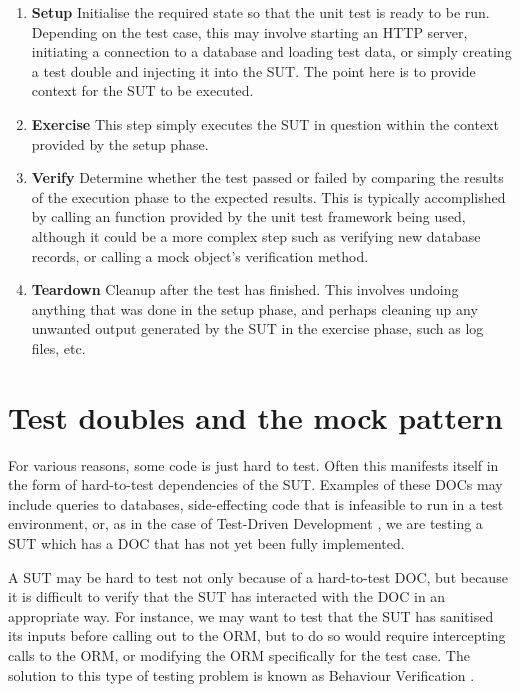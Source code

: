\begin{enumerate}

\item \textbf{Setup} Initialise the required state so that the unit
  test is ready to be run. Depending on the test case, this may
  involve starting an HTTP server, initiating a connection to a
  database and loading test data, or simply creating a test double and
  injecting it into the SUT. The point here is to provide context for
  the SUT to be executed.

\item \textbf{Exercise} This step simply executes the SUT in question
  within the context provided by the setup phase.

\item \textbf{Verify} Determine whether the test passed or failed by
  comparing the results of the execution phase to the expected
  results. This is typically accomplished by calling an 
  function provided by the unit test framework being used, although it
  could be a more complex step such as verifying new database
  records, or calling a mock object's verification
  method.%

\item \textbf{Teardown} Cleanup after the test has finished. This
  involves undoing anything that was done in the setup phase, and
  perhaps cleaning up any unwanted output generated by the SUT in the
  exercise phase, such as log files, etc.

\end{enumerate}

\section{Test doubles and the mock pattern}

For various reasons, some code is just hard to test. Often this
manifests itself in the form of hard-to-test dependencies of the
SUT. Examples of these DOCs may include queries to databases,
side-effecting code that is infeasible to run in a test environment,
or, as in the case of Test-Driven Development \cite{beck:tdd}, we are
testing a SUT which has a DOC that has not yet been fully implemented.

A SUT may be hard to test not only because of a hard-to-test DOC, but
because it is difficult to verify that the SUT has interacted with the
DOC in an appropriate way. For instance, we may want to test that the
SUT has sanitised its inputs before calling out to the ORM, but to do
so would require intercepting calls to the ORM, or modifying the ORM
specifically for the test case. The solution to this type of testing
problem is known as Behaviour Verification \cite{meszaros:xunit}.


